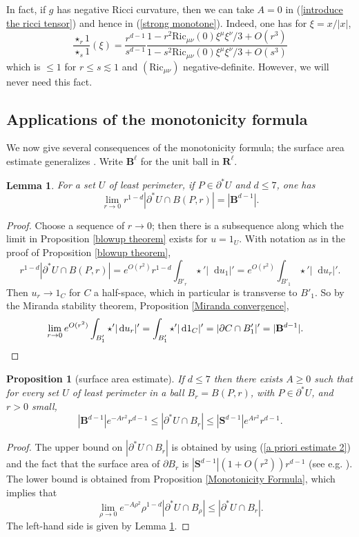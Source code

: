 \documentclass[reqno,12pt,letterpaper]{amsart}
\newcommand{\RR}{\mathbf{R}}
\newcommand{\Sph}{\mathbf S}
\newcommand{\Ball}{\mathbf{B}}
\newcommand{\Ric}{\mathrm{Ric}}
\newcommand*\dif{\mathop{}\!\mathrm{d}}
\newtheorem{lemma}[theorem]{Lemma}
\newtheorem{proposition}[theorem]{Proposition}
\theoremstyle{definition}
\numberwithin{equation}{section}
\begin{document}
In fact, if $g$ has negative Ricci curvature, then we can take $A = 0$ in (\ref{introduce the ricci tensor}) and hence in (\ref{strong monotone}). Indeed, one has for $\xi = x/|x|$,
$$\frac{\star_r 1}{\star_s 1}(\xi) = \frac{r^{d - 1}}{s^{d - 1}} \frac{1 - r^2 \Ric_{\mu \nu}(0) \xi^\mu \xi^\nu/3 + O(r^3)}{1 - s^2 \Ric_{\mu \nu}(0) \xi^\mu \xi^\nu/3 + O(s^3)}$$
which is $\leq 1$ for $r \leq s \lesssim 1$ and $(\Ric_{\mu\nu})$ negative-definite.
However, we will never need this fact.

\subsection{Applications of the monotonicity formula}
We now give several consequences of the monotonicity formula; the surface area estimate generalizes \cite[Remark 5.13]{Giusti77}.
Write $\Ball^\ell$ for the unit ball in $\RR^\ell$.

\begin{lemma}\label{least perimeter minimal size}
For a set $U$ of least perimeter, if $P \in \partial^* U$ and $d \leq 7$, one has
$$\lim_{r \to 0} r^{1 - d} |\partial^* U \cap B(P, r)| = |\Ball^{d - 1}|.$$
\end{lemma}
\begin{proof}
Choose a sequence of $r \to 0$; then there is a subsequence along which the limit in Proposition \ref{blowup theorem} exists for $u = 1_U$.
With notation as in the proof of Proposition \ref{blowup theorem},
$$r^{1 - d} |\partial^* U \cap B(P, r)| = e^{O(r^2)} r^{1 - d}\int_{B'_r} \star'|\dif u_1|' = e^{O(r^2)} \int_{B'_1} \star'|\dif u_r|'.$$
Then $u_r \to 1_C$ for $C$ a half-space, which in particular is transverse to $B'_1$.
So by the Miranda stability theorem, Proposition \ref{Miranda convergence},
\begin{align*}
\lim_{r \to 0} e^{O(r^2)} \int_{B'_1} \star'|\dif u_r|' &= \int_{B'_1} \star'|\dif 1_C|' = |\partial C \cap B'_1|' = |\Ball^{d - 1}|. \qedhere
\end{align*}
\end{proof}

\begin{proposition}[surface area estimate]\label{doubling dimension}
If $d \leq 7$ then there exists $A \geq 0$ such that for every set $U$ of least perimeter in a ball $B_r = B(P, r)$, with $P \in \partial^* U$, and $r > 0$ small,
$$|\Ball^{d - 1}|e^{-Ar^2}r^{d - 1} \leq |\partial^*U \cap B_r| \leq |\Sph^{d - 1}|e^{Ar^2} r^{d - 1}.$$
\end{proposition}
\begin{proof}
The upper bound on $|\partial^* U \cap B_r|$ is obtained by using (\ref{a priori estimate 2}) and the fact that the surface area of $\partial B_r$ is $|\Sph^{d - 1}|(1 + O(r^2))r^{d - 1}$ (see e.g. \cite{gray1974volume}).
The lower bound is obtained from Proposition \ref{Monotonicity Formula}, which implies that
$$\lim_{\rho \to 0} e^{-A\rho^2} \rho^{1 - d} |\partial^* U \cap B_\rho| \leq |\partial^* U \cap B_r|.$$
The left-hand side is given by Lemma \ref{least perimeter minimal size}.
\end{proof}
\end{document}
